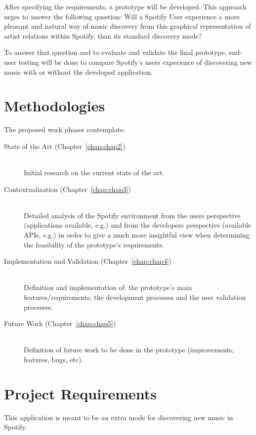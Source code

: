   After specifying the requirements, a prototype will be developed.
  This approach urges to answer the following question: Will a Spotify User experience a more pleasant and natural way of music discovery from this graphical representation of artist relations within Spotify, than its standard discovery mode?

  To answer that question and to evaluate and validate the final prototype, end-user testing will be done to compare Spotify's users experience of discovering new music with or without the developed application.

\section{Methodologies} %
\label{sec:methodologies}
  
  The proposed work phases contemplate:

  \begin{description}
    \item[State of the Art (Chapter~\ref{chap:chap2})] \hfill \\
      Initial research on the current state of the art.
    \item[Contextualization (Chapter~\ref{chap:chap3})] \hfill \\
      Detailed analysis of the Spotify environment from the users perspective (applications available, e.g.) and from the developers perspective (available APIs, e.g.) in order to give a much more insightful view when determining the feasibility of the prototype's requirements.
    \item[Implementation and Validation (Chapter~\ref{chap:chap4})] \hfill \\
      Definition and implementation of: the prototype's main features/requirements; the development processes and the user validation processes.
    \item[Future Work (Chapter~\ref{chap:chap5})] \hfill \\
      Definition of future work to be done in the prototype (improvements, features, bugs, etc).
  \end{description}


\section{Project Requirements}
\label{sec:proj}

  This application is meant to be an extra mode for discovering new music in Spotify.

